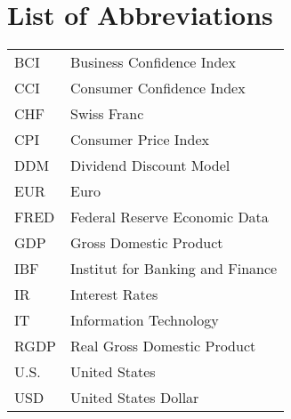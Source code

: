 

\tableofcontents

\newpage
\listoffigures

\newpage
\listoftables

\newpage
\section*{List of Abbreviations}
\label{sec:abbreviations}
\begin{table}[ht!]
 \begin{tabular}{ll}
	BCI		& Business Confidence Index\\
	CCI 	& Consumer Confidence Index\\
	CHF 	& Swiss Franc\\
	CPI 	& Consumer Price Index\\ 
	DDM		& Dividend Discount Model\\
	EUR		& Euro\\
	FRED	& Federal Reserve Economic Data\\
	GDP		& Gross Domestic Product\\
	IBF 	& Institut for Banking and Finance\\
	IR 		& Interest Rates\\
	IT		& Information Technology\\
	RGDP	& Real Gross Domestic Product\\
	U.S. 	& United States\\
	USD		& United States Dollar \\

	
 \end{tabular}
\end{table}


